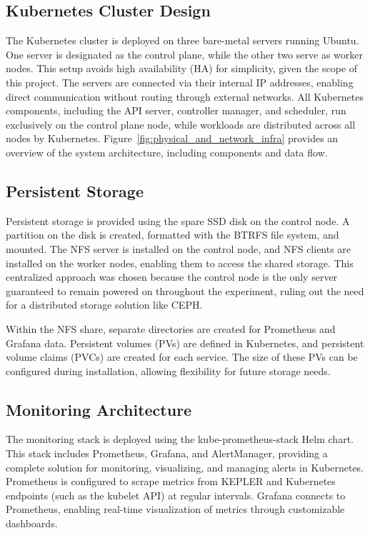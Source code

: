 \subsection{Kubernetes Cluster Design}

The Kubernetes cluster is deployed on three bare-metal servers running Ubuntu. One server is designated as the control plane, while the other two serve as worker nodes. This setup avoids high availability (HA) for simplicity, given the scope of this project. The servers are connected via their internal IP addresses, enabling direct communication without routing through external networks. All Kubernetes components, including the API server, controller manager, and scheduler, run exclusively on the control plane node, while workloads are distributed across all nodes by Kubernetes. Figure~\ref{fig:physical_and_network_infra} provides an overview of the system architecture, including components and data flow.

\subsection{Persistent Storage}

Persistent storage is provided using the spare SSD disk on the control node. A partition on the disk is created, formatted with the BTRFS file system, and mounted. The NFS server is installed on the control node, and NFS clients are installed on the worker nodes, enabling them to access the shared storage. This centralized approach was chosen because the control node is the only server guaranteed to remain powered on throughout the experiment, ruling out the need for a distributed storage solution like CEPH.

Within the NFS share, separate directories are created for Prometheus and Grafana data. Persistent volumes (PVs) are defined in Kubernetes, and persistent volume claims (PVCs) are created for each service. The size of these PVs can be configured during installation, allowing flexibility for future storage needs.

\subsection{Monitoring Architecture}

The monitoring stack is deployed using the kube-prometheus-stack Helm chart. This stack includes Prometheus, Grafana, and AlertManager, providing a complete solution for monitoring, visualizing, and managing alerts in Kubernetes. Prometheus is configured to scrape metrics from KEPLER and Kubernetes endpoints (such as the kubelet API) at regular intervals. Grafana connects to Prometheus, enabling real-time visualization of metrics through customizable dashboards.

